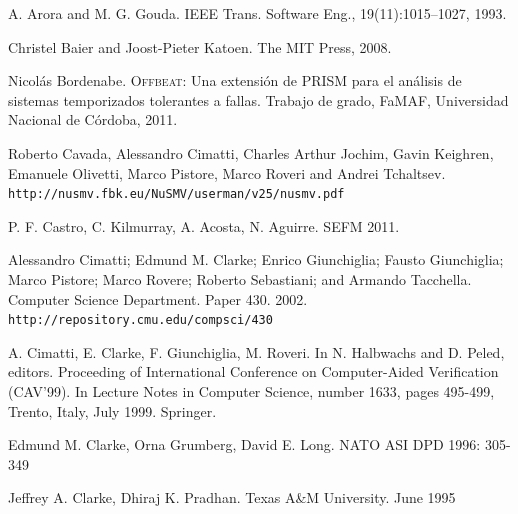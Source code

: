 \documentclass[pdftex,a4paper,12pt]{book}
\begin{document}
\begin{thebibliography}{99}



A. Arora and M. G. Gouda. 
\newblock IEEE Trans. Software Eng., 19(11):1015–1027, 1993.


Christel Baier and Joost-Pieter Katoen.
\newblock The MIT Press, 2008.


Nicol\'as Bordenabe.
\newblock \textsc{Offbeat}: {U}na extensi\'on de {PRISM} para el an\'alisis de
  sistemas temporizados tolerantes a fallas.
\newblock Trabajo de grado, FaMAF, Universidad Nacional de C\'ordoba, 2011.


Roberto Cavada, Alessandro Cimatti, Charles Arthur Jochim, Gavin Keighren, Emanuele Olivetti, Marco Pistore, Marco Roveri and Andrei Tchaltsev.
\newblock \texttt{http://nusmv.fbk.eu/NuSMV/userman/v25/nusmv.pdf}


P. F. Castro, C. Kilmurray, A. Acosta, N. Aguirre. 
\newblock SEFM 2011.


Alessandro Cimatti; Edmund M. Clarke; Enrico Giunchiglia; Fausto Giunchiglia; Marco Pistore; Marco Rovere; Roberto Sebastiani; and Armando Tacchella.
\newblock Computer Science Department. Paper 430. 2002.
\newblock \texttt{http://repository.cmu.edu/compsci/430}


A. Cimatti, E. Clarke, F. Giunchiglia, M. Roveri. 
\newblock In N. Halbwachs and D. Peled, editors. Proceeding of International Conference on Computer-Aided Verification (CAV'99). In Lecture Notes in Computer Science, number 1633, pages 495-499, Trento, Italy, July 1999. Springer.



Edmund M. Clarke, Orna Grumberg, David E. Long.
\newblock NATO ASI DPD 1996: 305-349


Jeffrey A. Clarke, Dhiraj K. Pradhan.
\newblock  Texas A\&M University. June 1995



\end{thebibliography}
\end{document}
